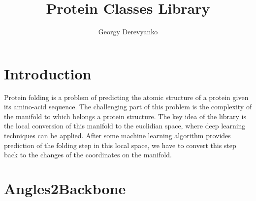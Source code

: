 \documentclass[a4paper,10pt]{article}
\title{Protein Classes Library}
\author{Georgy Derevyanko}
\begin{document}
\maketitle

\section{Introduction}
Protein folding is a problem of predicting the atomic structure of a protein given its amino-acid sequence. 
The challenging part of this problem is the complexity of the manifold to which belongs a protein structure.
The key idea of the library is the local conversion of this manifold to the euclidian space, where deep learning
techniques can be applied. After some machine learning algorithm provides prediction of the folding step in this 
local space, we have to convert this step back to the changes of the coordinates on the manifold.

\section{Angles2Backbone}





\end{document}
